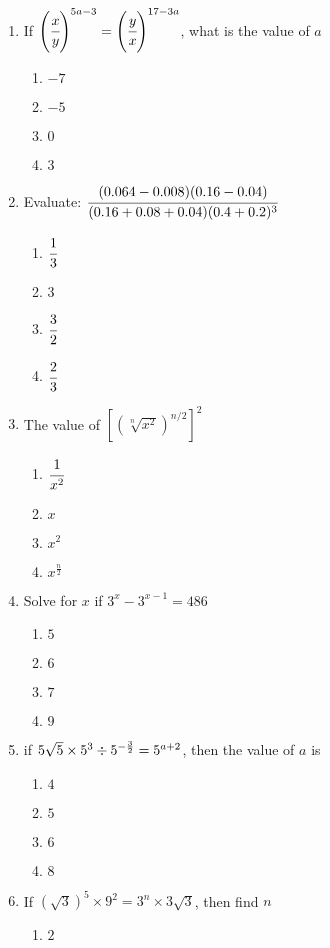 \begin{multicols}{2}
\begin{enumerate}[label={\arabic*.}]
\item If $\left(\cfrac{x}{y}\right)^{5a-3} = \left(\cfrac{y}{x}\right)^{17-3a}$, what is the value of $a$
	\begin{enumerate}[label={\Alph*.}]
	\item \(-7\)
	\item \(-5\)
	\item \(0\)
	\item \(3\)
	\end{enumerate}
\item Evaluate: $\cfrac{(0.064 - 0.008)(0.16 -0.04)}{(0.16+0.08+0.04)(0.4+0.2)^3}$
	\begin{enumerate}[label={\Alph*.}]
	\item \(\cfrac{1}{3}\)
	\item \(3\)
	\item \(\cfrac{3}{2}\)
	\item \(\cfrac{2}{3}\)
	\end{enumerate}
\item The value of $\left[\left(\sqrt[n]{x^2}\right)^{n/2}\right]^2$
	\begin{enumerate}[label={\Alph*.}]
	\item \(\cfrac{1}{x^2}\)
	\item \(x\)
	\item \(x^2\)
	\item \(x^{\frac{n}{2}}\)
	\end{enumerate}
\item Solve for $x$ if $3^x - 3^{x-1} = 486$
	\begin{enumerate}[label={\Alph*.}]
	\item \(5\)
	\item \(6\)
	\item \(7\)
	\item \(9\)
	\end{enumerate}
\item if $5\sqrt{5} \times 5^3 \divisionsymbol 5^{-\frac{3}{2}} = 5^{a+2}$, then the value of $a$ is 
	\begin{enumerate}[label={\Alph*.}]
	\item \(4\)
	\item \(5\)
	\item \(6\)
	\item \(8\)
	\end{enumerate}
\item If $\left(\sqrt{3}\right)^5 \times 9^2 = 3^n \times 3\sqrt{3}$, then find $n$
	\begin{enumerate}[label={\Alph*.}]
	\item \(2\)

\end{enumerate}
\end{enumerate}
\end{multicols}
